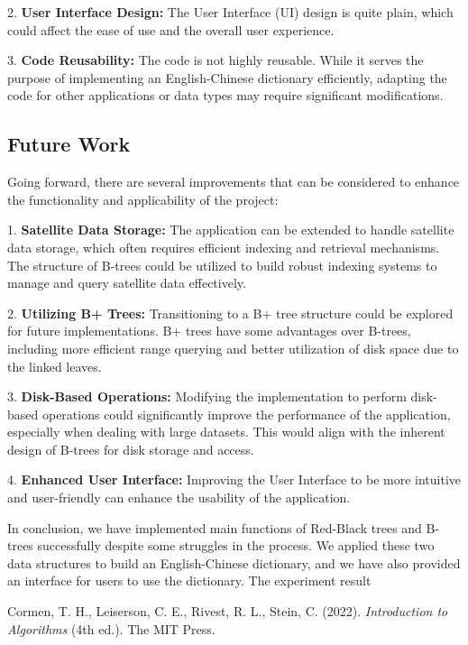 \documentclass[UTF8]{ctexart}
\begin{document}
2. \textbf{User Interface Design:} The User Interface (UI) design is quite plain, which could affect the ease of use and the overall user experience.

3. \textbf{Code Reusability:} The code is not highly reusable. While it serves the purpose of implementing an English-Chinese dictionary efficiently, adapting the code for other applications or data types may require significant modifications.

\subsection{Future Work}
Going forward, there are several improvements that can be considered to enhance the functionality and applicability of the project:

1. \textbf{Satellite Data Storage:} The application can be extended to handle satellite data storage, which often requires efficient indexing and retrieval mechanisms. The structure of B-trees could be utilized to build robust indexing systems to manage and query satellite data effectively.

2. \textbf{Utilizing B+ Trees:} Transitioning to a B+ tree structure could be explored for future implementations. B+ trees have some advantages over B-trees, including more efficient range querying and better utilization of disk space due to the linked leaves.

3. \textbf{Disk-Based Operations:} Modifying the implementation to perform disk-based operations could significantly improve the performance of the application, especially when dealing with large datasets. This would align with the inherent design of B-trees for disk storage and access.

4. \textbf{Enhanced User Interface:} Improving the User Interface to be more intuitive and user-friendly can enhance the usability of the application.

In conclusion, we have implemented main functions of Red-Black trees and B-trees successfully despite some struggles in the process. We applied these two data structures to build
an English-Chinese dictionary, and we have also provided an interface for users to use the dictionary. The experiment result 

\begin{thebibliography}{9}
Cormen, T. H., Leiserson, C. E., Rivest, R. L., Stein, C. (2022). 
\textit{Introduction to Algorithms} (4th ed.). The MIT Press.
\end{thebibliography}
\end{document}
